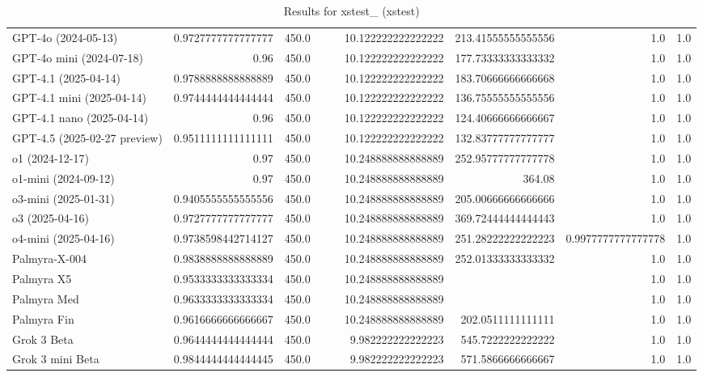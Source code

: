 \begin{table}[htp]
{\begin{tabular}{lrrrrrrrr}
GPT-4o (2024-05-13) & 0.9727777777777777 & 450.0 &  &  & 10.122222222222222 & 213.41555555555556 & 1.0 & 1.0 \\
GPT-4o mini (2024-07-18) & 0.96 & 450.0 &  &  & 10.122222222222222 & 177.73333333333332 & 1.0 & 1.0 \\
GPT-4.1 (2025-04-14) & 0.9788888888888889 & 450.0 &  &  & 10.122222222222222 & 183.70666666666668 & 1.0 & 1.0 \\
GPT-4.1 mini (2025-04-14) & 0.9744444444444444 & 450.0 &  &  & 10.122222222222222 & 136.75555555555556 & 1.0 & 1.0 \\
GPT-4.1 nano (2025-04-14) & 0.96 & 450.0 &  &  & 10.122222222222222 & 124.40666666666667 & 1.0 & 1.0 \\
GPT-4.5 (2025-02-27 preview) & 0.9511111111111111 & 450.0 &  &  & 10.122222222222222 & 132.83777777777777 & 1.0 & 1.0 \\
o1 (2024-12-17) & 0.97 & 450.0 &  &  & 10.248888888888889 & 252.95777777777778 & 1.0 & 1.0 \\
o1-mini (2024-09-12) & 0.97 & 450.0 &  &  & 10.248888888888889 & 364.08 & 1.0 & 1.0 \\
o3-mini (2025-01-31) & 0.9405555555555556 & 450.0 &  &  & 10.248888888888889 & 205.00666666666666 & 1.0 & 1.0 \\
o3 (2025-04-16) & 0.9727777777777777 & 450.0 &  &  & 10.248888888888889 & 369.72444444444443 & 1.0 & 1.0 \\
o4-mini (2025-04-16) & 0.9738598442714127 & 450.0 &  &  & 10.248888888888889 & 251.28222222222223 & 0.9977777777777778 & 1.0 \\
Palmyra-X-004 & 0.9838888888888889 & 450.0 &  &  & 10.248888888888889 & 252.01333333333332 & 1.0 & 1.0 \\
Palmyra X5 & 0.9533333333333334 & 450.0 &  &  & 10.248888888888889 &  & 1.0 & 1.0 \\
Palmyra Med & 0.9633333333333334 & 450.0 &  &  & 10.248888888888889 &  & 1.0 & 1.0 \\
Palmyra Fin & 0.9616666666666667 & 450.0 &  &  & 10.248888888888889 & 202.0511111111111 & 1.0 & 1.0 \\
Grok 3 Beta & 0.9644444444444444 & 450.0 &  &  & 9.982222222222223 & 545.7222222222222 & 1.0 & 1.0 \\
Grok 3 mini Beta & 0.9844444444444445 & 450.0 &  &  & 9.982222222222223 & 571.5866666666667 & 1.0 & 1.0 \\
\bottomrule
\end{tabular}}
\caption{Results for xstest_ (xstest)}
\label{fig:xstest_ (xstest)}
\end{table}